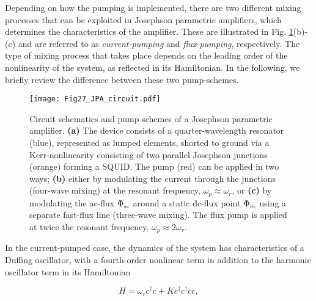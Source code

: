 \documentclass[aip,apr,twocolumn,showpacs,superscriptaddress,groupedaddress,nofootinbib,reprint]{revtex4-1}  %
\begin{document}
Depending on how the pumping is implemented, there are two different mixing processes that can be exploited in Josephson parametric amplifiers, which determines the characteristics of the amplifier. These are illustrated in Fig. \ref{Fig:JPAoperation}(b)-(c) and are referred to as \textit{current-pumping}\cite{Wahlsten1978,Olsson1988,Yurke1989,Siddiqi2004,Tholen2007} and \textit{flux-pumping}\cite{Castellanos-Beltran2007,Yamamoto2008,Castellanos-Beltran2008,Sandberg2008,Wilson2010,Wustmann2013,Sundqvist2013,Sundqvist2014,Wustmann2017}, respectively. The type of mixing process that takes place depends on the leading order of the nonlinearity of the system, as reflected in its Hamiltonian. In the following, we briefly review the difference between these two pump-schemes.

\begin{figure}[htp]
\begin{center}
\texttt{[image: Fig27\_JPA\_circuit.pdf]}
\caption{Circuit schematics and pump schemes of a Josephson parametric amplifier. \textbf{(a)} The device consists of a quarter-wavelength resonator (blue), represented as lumped elements, shorted to ground via a Kerr-nonlinearity consisting of two parallel Josephson junctions (orange) forming a SQUID. The pump (red) can be applied in two ways; \textbf{(b)} either by modulating the current through the junctions (four-wave mixing) at the resonant frequency, $\omega_p \approx \omega_r$, or \textbf{(c)} by modulating the ac-flux $\Phi_{\mbox{\tiny{ac}}}$ around a static dc-flux point $\Phi_{\mbox{\tiny{dc}}}$ using a separate fast-flux line (three-wave mixing). The flux pump is applied at twice the resonant frequency, $\omega_p \approx 2\omega_r$.}
\label{Fig:JPAoperation}
\end{center}
\end{figure}

In the current-pumped case, the dynamics of the system has characteristics of a Duffing oscillator\cite{Dykman1998}, with a fourth-order nonlinear term in addition to the harmonic oscillator term in its Hamiltonian

\begin{equation}
H = \omega_{r}c^{\dagger}c + K c^{\dagger}c^{\dagger}cc,
\label{Eq:Hfourwave}
\end{equation}
\end{document}
